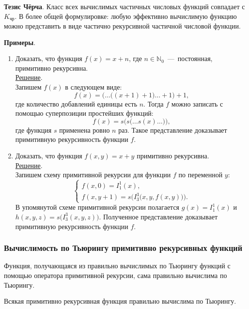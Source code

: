 \textbf{Тезис Чёрча}. Класс всех вычислимых частичных числовых функций совпадает с $K_{\text{чр}}$. В более общей формулировке: любую эффективно вычислимую функцию можно представить в виде частично рекурсивной частичной числовой функции.

\textbf{Примеры}.
\begin{enumerate}
    \item Доказать, что функция $f(x) = x + n$, где $n \in \mathbb{N}_0$~---~постоянная, примитивно рекурсивна. \\
    \underline{Решение}. \\
    Запишем $f(x)$ в следующем виде:
    \[
        f(x) = \Big(\dots\big((x + 1) + 1\big) \dots + 1\Big) + 1,
    \]
    где количество добавлений единицы есть $n$. Тогда $f$ можно записать с помощью суперпозиции простейших функций:
    \[
        f(x) = s\Big(s\big(\dots s(x) \dots\big)\Big),
    \]
    где функция $s$ применена ровно $n$ раз. Такое представление доказывает примитивную рекурсивность функции $f$.
    \item Доказать, что функция $f(x, y) = x + y$ примитивно рекурсивна. \\
    \underline{Решение}. \\
    Запишем схему примитивной рекурсии для функции $f$ по переменной $y$:
    \[
        \begin{cases}
            f(x, 0) = I_1^1(x), \\
            f(x, y + 1) = s\Big(I_3^3\big(x, y, f(x, y)\big)\Big).
        \end{cases}
    \]
    В упомянутой схеме примитивной рекурсии полагается $g(x) = I_1^1(x)$ и $h(x, y, z) = s\big(I_3^3(x, y, z)\big)$. Полученное представление доказывает примитивную рекурсивность функции $f$.
\end{enumerate}

\vspace*{2cm}
\subsubsection{Вычислимость по Тьюрингу примитивно рекурсивных функций}
\begin{theorem}
    Функция, получающаяся из правильно вычислимых по Тьюрингу функций с помощью оператора примитивной рекурсии, сама правильно вычислима по Тьюрингу.
\end{theorem}
\begin{corollary*}
    Всякая примитивно рекурсивная функция правильно вычислима по Тьюрингу. 
\end{corollary*}

